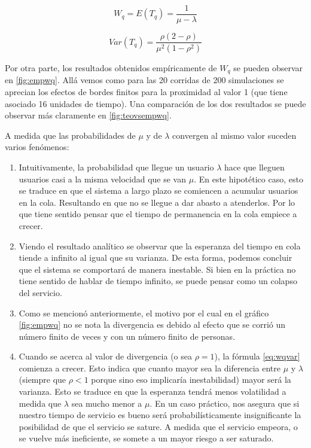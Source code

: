 \documentclass{sig-alternate}
\begin{document}
\begin{equation}
\label{eq:wq}
  W_q = E (T_q)= \frac{1}{\mu-\lambda}
\end{equation}

\begin{equation}
\label{eq:wqvar}
  Var(T_q) = \frac{\rho(2-\rho)}{\mu^2(1-\rho^2)}
\end{equation}

Por otra parte, los resultados obtenidos emp\'iricamente de $W_q$ se pueden observar en \ref{fig:empwq}.
All\'a vemos como para las 20 corridas de 200 simulaciones se aprecian los efectos de bordes finitos para
la proximidad al valor 1 (que tiene asociado 16 unidades de tiempo).
Una comparaci\'on de los dos resultados se puede observar m\'as claramente en \ref{fig:teovsempwq}.

A medida que las probabilidades de $\mu$ y de $\lambda$ convergen al mismo valor suceden varios fen\'omenos: 
\begin{enumerate}
\item Intuitivamente, la probabilidad que llegue un usuario $\lambda$ hace que lleguen usuarios casi a la misma velocidad que se van $\mu$. En este hipotético caso, esto se traduce en que el sistema a largo plazo se comiencen a acumular usuarios en la cola. Resultando en que no se llegue a dar abasto a atenderlos. Por lo que tiene sentido pensar que el tiempo de permanencia en la cola empiece a crecer.
\item Viendo el resultado anal\'itico se observar que la esperanza del tiempo en cola tiende a infinito al igual que su varianza. De esta forma, podemos concluir que el sistema se comportará de manera inestable. Si bien en la práctica no tiene sentido de hablar de tiempo infinito, se puede pensar como un colapso del servicio.
\item Como se mencion\'o anteriormente, el motivo por el cual en el gr\'afico \ref{fig:empwq} no se nota la divergencia es debido al efecto que se corrió un número finito de veces y con un número finito de personas. 
\item Cuando se acerca al valor de divergencia (o sea $\rho=1$), la f\'ormula \ref{eq:wqvar}  comienza a crecer.
Esto indica que cuanto mayor sea la diferencia entre $\mu$ y $\lambda$ (siempre que $\rho < 1$ porque sino eso
implicar\'ia inestabilidad) mayor ser\'a la varianza.
Esto se traduce en que la esperanza tendr\'a menos volatilidad a medida que $\lambda$ sea mucho menor a $\mu$.
En un caso pr\'actico, nos asegura que si nuestro tiempo de servicio es bueno ser\'a probabil\'isticamente
insignificante la posibilidad de que el servicio se sature.
A medida que el servicio empeora, o se vuelve m\'as ineficiente, se somete a un mayor riesgo a ser saturado.


\end{enumerate}
\end{document}
